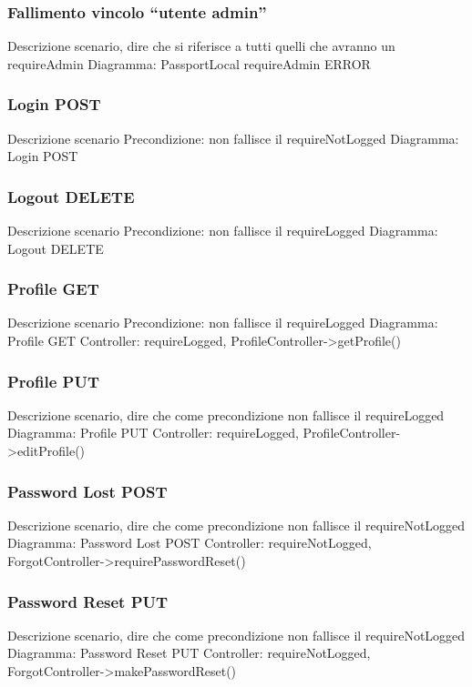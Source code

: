 \subsubsection{Fallimento vincolo ``utente admin''}
Descrizione scenario, dire che si riferisce a tutti quelli che avranno un requireAdmin
Diagramma: PassportLocal requireAdmin ERROR

\subsubsection{Login POST}
Descrizione scenario
Precondizione: non fallisce il requireNotLogged
Diagramma: Login POST

\subsubsection{Logout DELETE}
Descrizione scenario
Precondizione: non fallisce il requireLogged
Diagramma: Logout DELETE

\subsubsection{Profile GET}
Descrizione scenario
Precondizione: non fallisce il requireLogged
Diagramma: Profile GET
Controller: requireLogged, ProfileController->getProfile()

\subsubsection{Profile PUT}
Descrizione scenario, dire che come precondizione non fallisce il requireLogged
Diagramma: Profile PUT
Controller: requireLogged, ProfileController->editProfile()

\subsubsection{Password Lost POST}
Descrizione scenario, dire che come precondizione non fallisce il requireNotLogged
Diagramma: Password Lost POST
Controller: requireNotLogged, ForgotController->requirePasswordReset()

\subsubsection{Password Reset PUT}
Descrizione scenario, dire che come precondizione non fallisce il requireNotLogged
Diagramma: Password Reset PUT
Controller: requireNotLogged, ForgotController->makePasswordReset()

